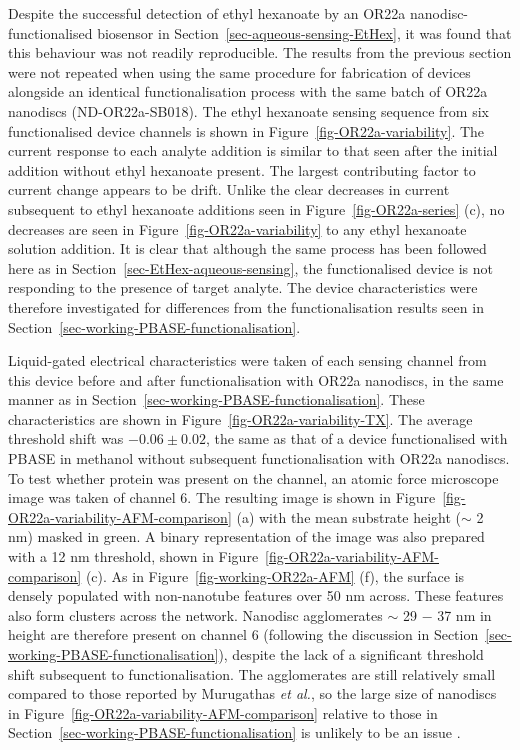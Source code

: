 \documentclass[
  a4paper,
]{scrbook}
\begin{document}
Despite the successful detection of ethyl hexanoate by an OR22a
nanodisc-functionalised biosensor in
Section~\ref{sec-aqueous-sensing-EtHex}, it was found that this
behaviour was not readily reproducible. The results from the previous
section were not repeated when using the same procedure for fabrication
of devices alongside an identical functionalisation process with the
same batch of OR22a nanodiscs (ND-OR22a-SB018). The ethyl hexanoate
sensing sequence from six functionalised device channels is shown in
Figure~\ref{fig-OR22a-variability}. The current response to each analyte
addition is similar to that seen after the initial addition without
ethyl hexanoate present. The largest contributing factor to current
change appears to be drift. Unlike the clear decreases in current
subsequent to ethyl hexanoate additions seen in
Figure~\ref{fig-OR22a-series} (c), no decreases are seen in
Figure~\ref{fig-OR22a-variability} to any ethyl hexanoate solution
addition. It is clear that although the same process has been followed
here as in Section~\ref{sec-EtHex-aqueous-sensing}, the functionalised
device is not responding to the presence of target analyte. The device
characteristics were therefore investigated for differences from the
functionalisation results seen in
Section~\ref{sec-working-PBASE-functionalisation}.

Liquid-gated electrical characteristics were taken of each sensing
channel from this device before and after functionalisation with OR22a
nanodiscs, in the same manner as in
Section~\ref{sec-working-PBASE-functionalisation}. These characteristics
are shown in Figure~\ref{fig-OR22a-variability-TX}. The average
threshold shift was \(-0.06 \pm 0.02\), the same as that of a device
functionalised with PBASE in methanol without subsequent
functionalisation with OR22a nanodiscs. To test whether protein was
present on the channel, an atomic force microscope image was taken of
channel 6. The resulting image is shown in
Figure~\ref{fig-OR22a-variability-AFM-comparison} (a) with the mean
substrate height (\(\sim\) 2 nm) masked in green. A binary
representation of the image was also prepared with a 12 nm threshold,
shown in Figure~\ref{fig-OR22a-variability-AFM-comparison} (c). As in
Figure~\ref{fig-working-OR22a-AFM} (f), the surface is densely populated
with non-nanotube features over 50 nm across. These features also form
clusters across the network. Nanodisc agglomerates \(\sim\) 29 \(-\) 37
nm in height are therefore present on channel 6 (following the
discussion in Section~\ref{sec-working-PBASE-functionalisation}),
despite the lack of a significant threshold shift subsequent to
functionalisation. The agglomerates are still relatively small compared
to those reported by Murugathas \emph{et al.}, so the large size of
nanodiscs in Figure~\ref{fig-OR22a-variability-AFM-comparison} relative
to those in Section~\ref{sec-working-PBASE-functionalisation} is
unlikely to be an issue \autocite{Murugathas2019a}.
\end{document}
